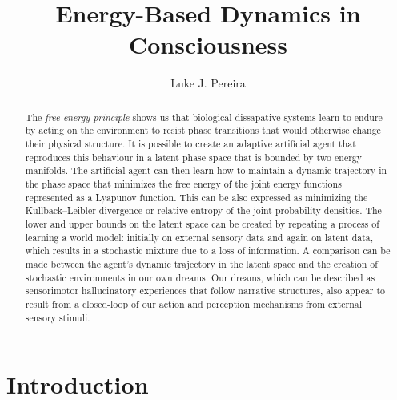 \documentclass{article}
\title{Energy-Based Dynamics in Consciousness}
\author{%
  Luke J. Pereira \\
}
\begin{document}
\maketitle

\begin{abstract}
The \textit{free energy principle} shows us that biological dissapative systems learn to endure by acting on the environment to resist phase transitions that would otherwise change their physical structure. It is possible to create an adaptive artificial agent that reproduces this behaviour in a latent phase space that is bounded by two energy manifolds. The artificial agent can then learn how to maintain a dynamic trajectory in the phase space that minimizes the free energy of the joint energy functions represented as a Lyapunov function. This can be also expressed as minimizing the Kullback–Leibler divergence or relative entropy of the joint probability densities. The lower and upper bounds on the latent space can be created by repeating a process of learning a world model: initially on external sensory data and again on latent data, which results in a stochastic mixture due to a loss of information. A comparison can be made between the agent's dynamic trajectory in the latent space and the creation of stochastic environments in our own dreams. Our dreams, which can be described as sensorimotor hallucinatory experiences that follow narrative structures, also appear to result from a closed-loop of our action and perception mechanisms from external sensory stimuli.
\end{abstract}

\begin{center}
    
\end{center}

\newpage

\section{Introduction}
\end{document}
